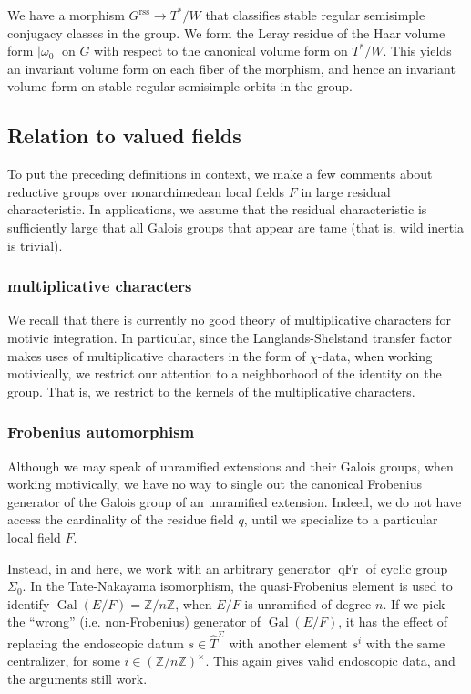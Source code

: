 \documentclass[12pt]{amsart}
\newcommand{\op}[1]{\operatorname{#1}}
\newcommand{\ring}[1]{{\mathbb #1}}
\newcommand{\reg}{\mathrm{rss}}
\theoremstyle{plain}
\theoremstyle{definition}
\begin{document}
We have a morphism $G^\reg\to T^*/W$ that classifies stable regular
semisimple conjugacy classes in the group.  We form the Leray residue
of the Haar volume form $|\omega_0|$ on $G$ with respect to the
canonical volume form on $T^*/W$.  This yields an invariant volume
form on each fiber of the morphism, and hence an invariant volume form
on stable regular semisimple orbits in the group.



\subsection{Relation to valued fields}

To put the preceding definitions in context, we make a few comments
about reductive groups over nonarchimedean local fields $F$ in large
residual characteristic.  In applications, we assume that the residual
characteristic is sufficiently large that all Galois groups that
appear are tame (that is, wild inertia is trivial).


\subsubsection{multiplicative characters}

We recall that there is currently no good theory of multiplicative
characters for motivic integration.  In particular, since the
Langlands-Shelstand transfer factor makes uses of multiplicative
characters in the form of $\chi$-data, when working motivically,
we restrict our attention to a neighborhood of the identity on the
group.  That is, we restrict to the kernels of the multiplicative
characters.

\subsubsection{Frobenius automorphism}

Although we may speak of unramified extensions and their Galois
groups, when working motivically, we have no way to single out the
canonical Frobenius generator of the Galois group of an unramified
extension.  Indeed, we do not have access the cardinality of the
residue field $q$, until we specialize to a particular local field
$F$.

Instead, in \cite{CHL} and here, we work with an arbitrary generator
$\op{qFr}$ of cyclic group $\Sigma_0$.  In the Tate-Nakayama
isomorphism, the quasi-Frobenius element is used to identify
$\op{Gal}(E/F) = \ring{Z}/n\ring{Z}$, when $E/F$ is unramified of
degree $n$.  If we pick the ``wrong'' (i.e. non-Frobenius) generator
of $\op{Gal}(E/F)$, it has the effect of replacing the endoscopic
datum $s\in \hat T^\Sigma$ with another element $s^i$ with the same
centralizer, for some $i\in (\ring{Z}/n\ring{Z})^\times$.  This again
gives valid endoscopic data, and the arguments still work.
\end{document}
